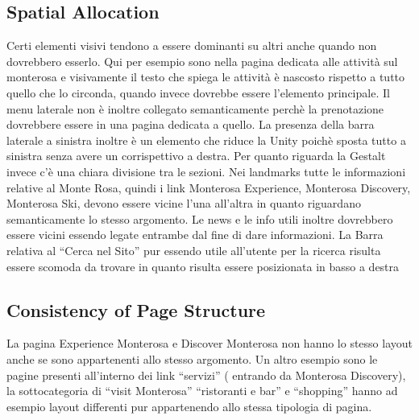         \subsection{Spatial Allocation}
        Certi elementi visivi tendono a essere dominanti su altri anche quando
        non dovrebbero esserlo. Qui per esempio sono nella pagina dedicata alle
        attività sul monterosa e visivamente il testo che spiega le attività è
        nascosto rispetto a tutto quello che lo circonda, quando invece dovrebbe
        essere l’elemento principale. Il menu laterale non è inoltre collegato
        semanticamente perchè la prenotazione dovrebbere essere in una pagina
        dedicata a quello.
        La presenza della barra laterale a sinistra inoltre è un elemento che
        riduce la Unity poichè sposta tutto a sinistra senza avere un
        corrispettivo a destra. Per quanto riguarda la Gestalt invece c’è una
        chiara divisione tra le sezioni. Nei landmarks tutte le informazioni
        relative al Monte Rosa, quindi i link Monterosa Experience, Monterosa
        Discovery, Monterosa Ski, devono essere vicine l'una all'altra in quanto
        riguardano semanticamente lo stesso argomento. Le news e le info utili
        inoltre dovrebbero essere vicini essendo legate entrambe dal fine di
        dare informazioni. La Barra relativa al “Cerca nel Sito” pur essendo
        utile all'utente per la ricerca risulta essere scomoda da trovare in
        quanto risulta essere posizionata in basso a destra
        \subsection{Consistency of Page Structure}
        La pagina Experience Monterosa e Discover Monterosa non hanno lo stesso
        layout anche se sono appartenenti allo stesso argomento. Un altro
        esempio sono le pagine presenti all'interno  dei link “servizi” (
        entrando da Monterosa Discovery), la sottocategoria di “visit Monterosa”
        “ristoranti e bar” e  “shopping” hanno ad esempio layout differenti pur
        appartenendo allo stessa tipologia di pagina.


        